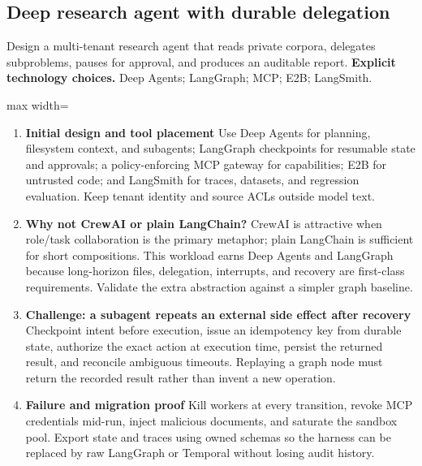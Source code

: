 \subsection{Deep research agent with durable delegation}
Design a multi-tenant research agent that reads private corpora, delegates subproblems, pauses for approval, and produces an auditable report.
\textbf{Explicit technology choices.} Deep Agents; LangGraph; MCP; E2B; LangSmith.
\begin{center}\begin{adjustbox}{max width=\linewidth}\end{adjustbox}\end{center}
\begin{enumerate}
\item \textbf{Initial design and tool placement} Use Deep Agents for planning, filesystem context, and subagents; LangGraph checkpoints for resumable state and approvals; a policy-enforcing MCP gateway for capabilities; E2B for untrusted code; and LangSmith for traces, datasets, and regression evaluation. Keep tenant identity and source ACLs outside model text.
\item \textbf{Why not CrewAI or plain LangChain?} CrewAI is attractive when role/task collaboration is the primary metaphor; plain LangChain is sufficient for short compositions. This workload earns Deep Agents and LangGraph because long-horizon files, delegation, interrupts, and recovery are first-class requirements. Validate the extra abstraction against a simpler graph baseline.
\item \textbf{Challenge: a subagent repeats an external side effect after recovery} Checkpoint intent before execution, issue an idempotency key from durable state, authorize the exact action at execution time, persist the returned result, and reconcile ambiguous timeouts. Replaying a graph node must return the recorded result rather than invent a new operation.
\item \textbf{Failure and migration proof} Kill workers at every transition, revoke MCP credentials mid-run, inject malicious documents, and saturate the sandbox pool. Export state and traces using owned schemas so the harness can be replaced by raw LangGraph or Temporal without losing audit history.
\end{enumerate}
